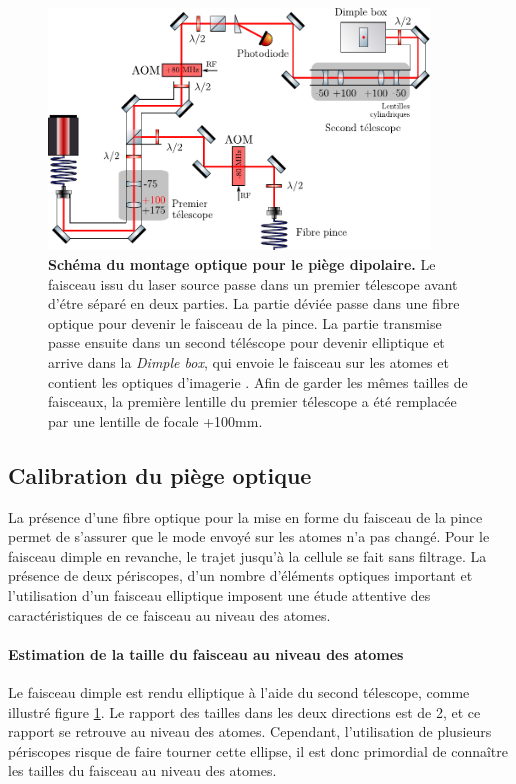 \begin{figure}
\centering
\includegraphics[width=0.9\textwidth]{Fig/Modif_exp/optique_1070.pdf}
\caption{\textbf{Schéma du montage optique pour le piège dipolaire.} Le faisceau issu du laser source passe dans un premier télescope avant d'étre séparé en deux parties. La partie déviée passe dans une fibre optique pour devenir le faisceau de la pince. La partie transmise passe ensuite dans un second téléscope pour devenir elliptique et arrive dans la \emph{Dimple box}, qui envoie le faisceau sur les atomes et contient les optiques d'imagerie \citep{muller2015coherent}. Afin de garder les mêmes tailles de faisceaux, la première lentille du premier télescope a été remplacée par une lentille de focale +100mm.}
\label{fig:optique_1070}
\end{figure}


\subsection{Calibration du piège optique}
La présence d'une fibre optique pour la mise en forme du faisceau de la pince permet de s'assurer que le mode envoyé sur les atomes n'a pas changé. Pour le faisceau dimple en revanche, le trajet jusqu'à la cellule se fait sans filtrage. La présence de deux périscopes, d'un nombre d'éléments optiques important et l'utilisation d'un faisceau elliptique imposent une étude attentive des caractéristiques de ce faisceau au niveau des atomes.



\paragraph*{Estimation de la taille du faisceau au niveau des atomes}
Le faisceau dimple est rendu elliptique à l'aide du second télescope, comme illustré figure \ref{fig:optique_1070}. Le rapport des tailles dans les deux directions est de 2, et ce rapport se retrouve au niveau des atomes. Cependant, l'utilisation de plusieurs périscopes risque de faire tourner cette ellipse, il est donc primordial de connaître les tailles du faisceau au niveau des atomes.

